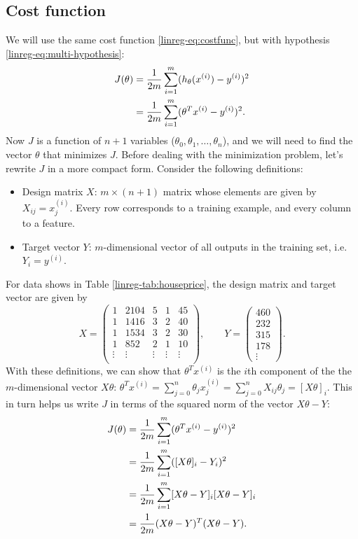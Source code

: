 \documentclass{article}
\begin{document}
\subsection{Cost function}
We will use the same cost function \eqref{linreg-eq:costfunc}, but with hypothesis \eqref{linreg-eq:multi-hypothesis}:
\begin{align}
    J(\theta) &= \frac{1}{2m}\sum_{i=1}^{m}(h_{\theta}(x^{(i)}) - y^{(i)})^2 \notag\\
    &= \frac{1}{2m}\sum_{i=1}^{m}(\theta^Tx^{(i)} - y^{(i)})^2.
    \label{linreg-eq:multi-costfunc}
\end{align}
Now $J$ is a function of $n+1$ variables ($\theta_0, \theta_1, \dots, \theta_n$), and we will need to find the vector $\theta$ that minimizes $J$. Before dealing with the minimization problem, let's rewrite $J$ in a more compact form. Consider the following definitions:
\begin{itemize}
    \item Design matrix $X$: $m \times (n+1)$ matrix whose elements are given by $X_{ij} = x^{(i)}_j$. Every row corresponds to a training example, and every column to a feature.
    \item Target vector $Y$: $m$-dimensional vector of all outputs in the training set, i.e. $Y_i=y^{(i)}$.
\end{itemize}
For data shows in Table \ref{linreg-tab:houseprice}, the design matrix and target vector are given by
\begin{equation}
    X =
    \begin{pmatrix}
        1 & 2104 & 5 & 1 & 45 \\
        1 & 1416 & 3 & 2 & 40 \\
        1 & 1534 & 3 & 2 & 30 \\
        1 & 852 & 2 & 1 & 10 \\
        \vdots & \vdots & \vdots & \vdots & \vdots \\
    \end{pmatrix},
    \qquad
    Y =
    \begin{pmatrix}
        460 \\
        232 \\
        315 \\
        178 \\
        \vdots
    \end{pmatrix}.
\end{equation}
With these definitions, we can show that $\theta^Tx^{(i)}$ is the $i$th component of the the $m$-dimensional vector $X\theta$: $\theta^Tx^{(i)}=\sum_{j=0}^n\theta_jx^{(i)}_j=\sum_{j=0}^nX_{ij}\theta_j=[X\theta]_i$. This in turn helps us write $J$ in terms of the squared norm of the vector $X\theta - Y$:
\begin{align}
    J(\theta) &= \frac{1}{2m}\sum_{i=1}^{m}(\theta^Tx^{(i)} - y^{(i)})^2\notag\\
    &= \frac{1}{2m}\sum_{i=1}^{m}([X\theta]_i - Y_i)^2\notag\\
    &= \frac{1}{2m}\sum_{i=1}^{m}[X\theta - Y]_i[X\theta - Y]_i\notag\\
    &= \frac{1}{2m}(X\theta - Y)^T(X\theta - Y).
    \label{linreg-eq:multi-costfunc-mat}
\end{align}
\end{document}
